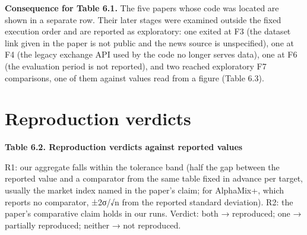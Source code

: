 \documentclass[12pt,a4paper]{report}
\begin{document}
\textbf{Consequence for Table 6.1.} The five papers whose code was
located are shown in a separate row. Their later stages were examined
outside the fixed execution order and are reported as exploratory: one
exited at F3 (the dataset link given in the paper is not public and the
news source is unspecified), one at F4 (the legacy exchange API used by
the code no longer serves data), one at F6 (the evaluation period is not
reported), and two reached exploratory F7 comparisons, one of them
against values read from a figure (Table 6.3).

\section{Reproduction verdicts}\label{reproduction-verdicts}

\textbf{Table 6.2. Reproduction verdicts against reported values}

R1: our aggregate falls within the tolerance band (half the gap between
the reported value and a comparator from the same table fixed in advance
per target, usually the market index named in the paper's claim; for
AlphaMix+, which reports no comparator, ±2σ/√n from the reported
standard deviation). R2: the paper's comparative claim holds in our
runs. Verdict: both → reproduced; one → partially reproduced; neither →
not reproduced.
\end{document}
